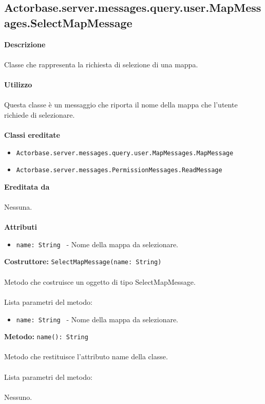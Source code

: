 \documentclass[a4paper]{article}
\begin{document}
	\subsection{Actorbase.server.messages.query.user.MapMessages.SelectMapMessage}
		\textbf{Descrizione}
			\\ \\
		Classe che rappresenta la richiesta di selezione di una mappa.
			\\ \\
		\textbf{Utilizzo}
			\\ \\
		Questa classe è un messaggio che riporta il nome della mappa che l'utente richiede di selezionare.
			\\ \\
		\textbf{Classi ereditate}
			\begin{itemize}
				\item \texttt{Actorbase.server.messages.query.user.MapMessages.MapMessage }
				\item \texttt{Actorbase.server.messages.PermissionMessages.ReadMessage }
			\end{itemize}
		\textbf{Ereditata da}
			\\ \\
			Nessuna.
			\\ \\
		\textbf{Attributi}
			\begin{itemize}
				\item \texttt{name: String } - Nome della mappa da selezionare.
			\end{itemize}
		\textbf{Costruttore: }\texttt{SelectMapMessage(name: String)}
			\\ \\
		Metodo che costruisce un oggetto di tipo SelectMapMessage.
			\\ \\
		Lista parametri del metodo:
			\begin{itemize}
				\item \texttt{name: String } - Nome della mappa da selezionare.
			\end{itemize}
		\textbf{Metodo: }\texttt{name(): String}
			\\ \\
		Metodo che restituisce l'attributo name della classe.
			\\ \\
		Lista parametri del metodo:
			\\ \\
			Nessuno.
			
\end{document}
